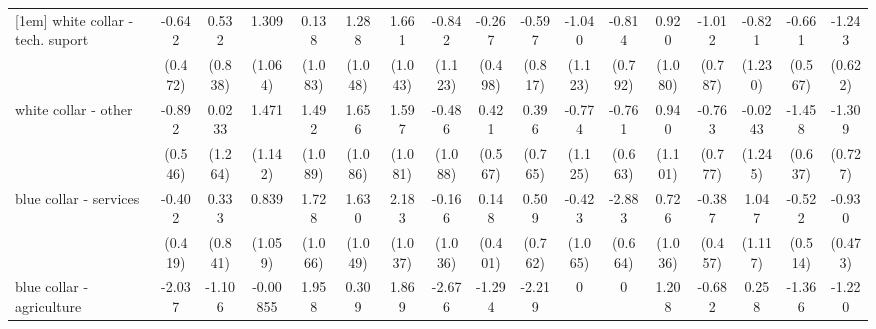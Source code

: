 {\begin{tabular}{l*{16}{c}}
[1em]
white collar - tech. suport&      -0.642         &       0.532         &       1.309         &       0.138         &       1.288         &       1.661         &      -0.842         &      -0.267         &      -0.597         &      -1.040         &      -0.814         &       0.920         &      -1.012         &      -0.821         &      -0.661         &      -1.243\sym{*}  \\
                    &     (0.472)         &     (0.838)         &     (1.064)         &     (1.083)         &     (1.048)         &     (1.043)         &     (1.123)         &     (0.498)         &     (0.817)         &     (1.123)         &     (0.792)         &     (1.080)         &     (0.787)         &     (1.230)         &     (0.567)         &     (0.622)         \\
[1em]
white collar - other&      -0.892         &      0.0233         &       1.471         &       1.492         &       1.656         &       1.597         &      -0.486         &       0.421         &       0.396         &      -0.774         &      -0.761         &       0.940         &      -0.763         &     -0.0243         &      -1.458\sym{*}  &      -1.309         \\
                    &     (0.546)         &     (1.264)         &     (1.142)         &     (1.089)         &     (1.086)         &     (1.081)         &     (1.088)         &     (0.567)         &     (0.765)         &     (1.125)         &     (0.663)         &     (1.101)         &     (0.777)         &     (1.245)         &     (0.637)         &     (0.727)         \\
[1em]
blue collar - services&      -0.402         &       0.333         &       0.839         &       1.728         &       1.630         &       2.183\sym{*}  &      -0.166         &       0.148         &       0.509         &      -0.423         &      -2.883\sym{***}&       0.726         &      -0.387         &       1.047         &      -0.522         &      -0.930\sym{*}  \\
                    &     (0.419)         &     (0.841)         &     (1.059)         &     (1.066)         &     (1.049)         &     (1.037)         &     (1.036)         &     (0.401)         &     (0.762)         &     (1.065)         &     (0.664)         &     (1.036)         &     (0.457)         &     (1.117)         &     (0.514)         &     (0.473)         \\
[1em]
blue collar - agriculture&      -2.037         &      -1.106         &    -0.00855         &       1.958         &       0.309         &       1.869         &      -2.676         &      -1.294         &      -2.219         &           0         &           0         &       1.208         &      -0.682         &       0.258         &      -1.366         &      -1.220         \\

\end{tabular}}
